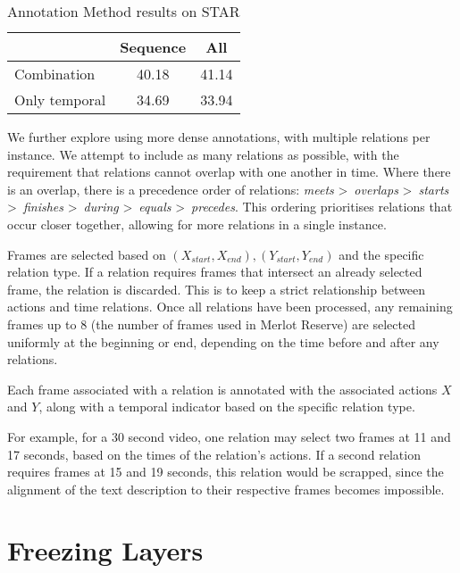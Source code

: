 \begin{table}[t]
	\centering
	\caption{Annotation Method results on STAR}
	\label{tab:annot_method}
	\begin{tabular}{lcc}
		\toprule
		 & Sequence & All \\
		\midrule
		Combination & 40.18 & 41.14 \\
		Only temporal & 34.69 & 33.94 \\
		\bottomrule
	\end{tabular}
\end{table}


We further explore using more dense annotations, with multiple relations per
instance. We attempt to include as many relations as possible, with the
requirement that relations cannot overlap with one another in time.  Where
there is an overlap, there is a precedence order of relations: \textit{meets}
\textgreater~\textit{overlaps} \textgreater~\textit{starts}
\textgreater~\textit{finishes} \textgreater~\textit{during}
\textgreater~\textit{equals} \textgreater~\textit{precedes}. This ordering
prioritises relations that occur closer together, allowing for more relations
in a single instance.

Frames are selected based on $(X_{start}, X_{end}), (Y_{start}, Y_{end})$ and
the specific relation type. If a relation requires frames that intersect an
already selected frame, the relation is discarded. This is to keep a strict
relationship between actions and time relations. Once all relations have been
processed, any remaining frames up to 8 (the number of frames used in Merlot
Reserve) are selected uniformly at the beginning or end, depending on the time
before and after any relations. %

Each frame associated with a relation is annotated with the associated actions
$X$ and $Y$, along with a temporal indicator based on the specific relation
type.

For example, for a 30 second video, one relation may select two frames
at 11 and 17 seconds, based on the times of the relation's actions. If a second
relation requires frames at 15 and 19 seconds, this relation would be scrapped,
since the alignment of the text description to their respective frames becomes
impossible.

\section{Freezing Layers}

